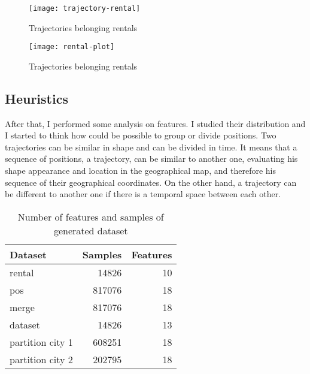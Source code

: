 \begin{figure}[bt]
	\centering
	\texttt{[image: trajectory-rental]}
	\caption{Trajectories belonging rentals}
	\label{fig:trajectory-rental}
\end{figure}

\begin{figure*}[bt]
	\centering
	\texttt{[image: rental-plot]}
	\caption{Trajectories belonging rentals}
	\label{fig:rental-plot}
\end{figure*}

\subsection{Heuristics}

After that, I performed some analysis on features. I studied their distribution and I started to think how could be possible to group or divide positions. Two trajectories can be similar in shape and can be divided in time. It means that a sequence of positions, a trajectory, can be similar to another one, evaluating his shape appearance and location in the geographical map, and therefore his sequence of their geographical coordinates. On the other hand, a trajectory can be different to another one if there is a temporal space between each other. 

\begin{table}
	\centering
	\caption{Number of features and samples of generated dataset}
	\begin{tabular}{ l r r }
		\hline
		Dataset & Samples & Features \\ \hline
		rental & 14826 & 10 \\ 
		pos & 817076 & 18 \\ 
		merge & 817076 & 18 \\
		dataset & 14826 & 13 \\
		partition city 1 & 608251 & 18 \\
		partition city 2 & 202795 & 18 \\ \hline
	\end{tabular}
\end{table}

